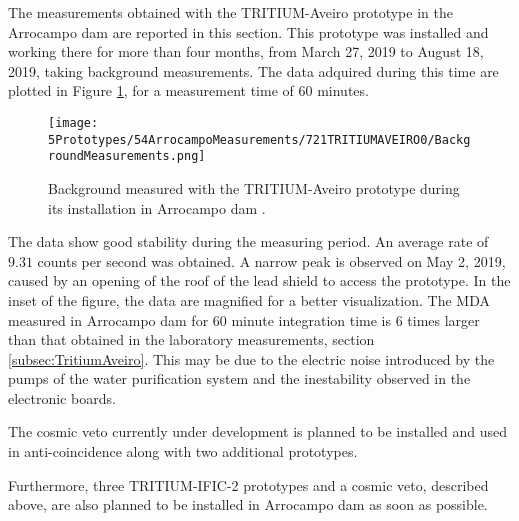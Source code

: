 The measurements obtained with the TRITIUM-Aveiro prototype in the Arrocampo dam are reported in this section. This prototype was installed and working there for more than four months, from March 27, 2019 to August 18, 2019, taking background measurements. The data adquired during this time are plotted in Figure \ref{fig:BackgroundArrocampoAveiro}, for a measurement time of 60 minutes.

\begin{figure}[h]
\centering
\texttt{[image: 5Prototypes/54ArrocampoMeasurements/721TRITIUMAVEIRO0/BackgroundMeasurements.png]}
\caption{Background measured with the TRITIUM-Aveiro prototype during its installation in Arrocampo dam \cite{ExperimentalPaperCarlos}.\label{fig:BackgroundArrocampoAveiro}}
\end{figure}
The data show good stability during the measuring period. An average rate of $9.31$ counts per second was obtained. A narrow peak is observed on May 2, 2019, caused by an opening of the roof of the lead shield to access the prototype. In the inset of the figure, the data are magnified for a better visualization. The MDA measured in Arrocampo dam for 60 minute integration time is 6 times larger than that obtained in the laboratory measurements, section \ref{subsec:TritiumAveiro}. This may be due to the electric noise introduced by the pumps of the water purification system and the inestability observed in the electronic boards.

The cosmic veto currently under development is planned to be installed and used in anti-coincidence along with two additional prototypes.

Furthermore, three TRITIUM-IFIC-2 prototypes and a cosmic veto, described above, are also planned to be installed in Arrocampo dam as soon as possible.